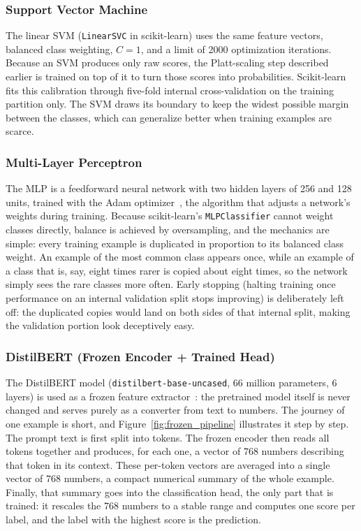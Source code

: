 \subsubsection{Support Vector Machine}

The linear SVM (\texttt{LinearSVC} in scikit-learn) uses the same feature vectors, balanced class weighting, $C=1$, and a limit of 2000 optimization iterations. Because an SVM produces only raw scores, the Platt-scaling step described earlier is trained on top of it to turn those scores into probabilities. Scikit-learn fits this calibration through five-fold internal cross-validation on the training partition only. The SVM draws its boundary to keep the widest possible margin between the classes, which can generalize better when training examples are scarce.

\subsubsection{Multi-Layer Perceptron}

The MLP is a feedforward neural network with two hidden layers of 256 and 128 units, trained with the Adam optimizer~\cite{kingma2015adam}, the algorithm that adjusts a network's weights during training. Because scikit-learn's \texttt{MLPClassifier} cannot weight classes directly, balance is achieved by oversampling, and the mechanics are simple: every training example is duplicated in proportion to its balanced class weight. An example of the most common class appears once, while an example of a class that is, say, eight times rarer is copied about eight times, so the network simply sees the rare classes more often. Early stopping (halting training once performance on an internal validation split stops improving) is deliberately left off: the duplicated copies would land on both sides of that internal split, making the validation portion look deceptively easy.

\subsubsection{DistilBERT (Frozen Encoder + Trained Head)}

The DistilBERT model (\texttt{distilbert-base-uncased}, 66 million parameters, 6 layers) is used as a frozen feature extractor~\cite{sanh2019distilbert}: the pretrained model itself is never changed and serves purely as a converter from text to numbers. The journey of one example is short, and Figure~\ref{fig:frozen_pipeline} illustrates it step by step. The prompt text is first split into tokens. The frozen encoder then reads all tokens together and produces, for each one, a vector of 768 numbers describing that token in its context. These per-token vectors are averaged into a single vector of 768 numbers, a compact numerical summary of the whole example. Finally, that summary goes into the classification head, the only part that is trained: it rescales the 768 numbers to a stable range and computes one score per label, and the label with the highest score is the prediction.

